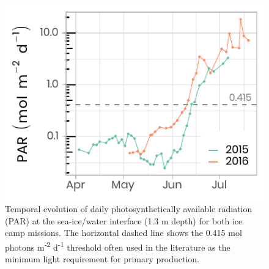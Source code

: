 \documentclass[12pt,a4paper]{scrartcl}
\begin{document}
\begin{figure}[h]
	\centering
	\includegraphics[scale = 2]{../../../graphs/fig05.pdf}
	\caption{Temporal evolution of daily photosynthetically available radiation (PAR) at the sea-ice/water interface (1.3 m depth) for both ice camp missions. The horizontal dashed line shows the 0.415 mol photons m\textsuperscript{-2} d\textsuperscript{-1} threshold often used in the literature as the minimum light requirement for primary production.}
\end{figure}

\clearpage
\newpage
\end{document}
